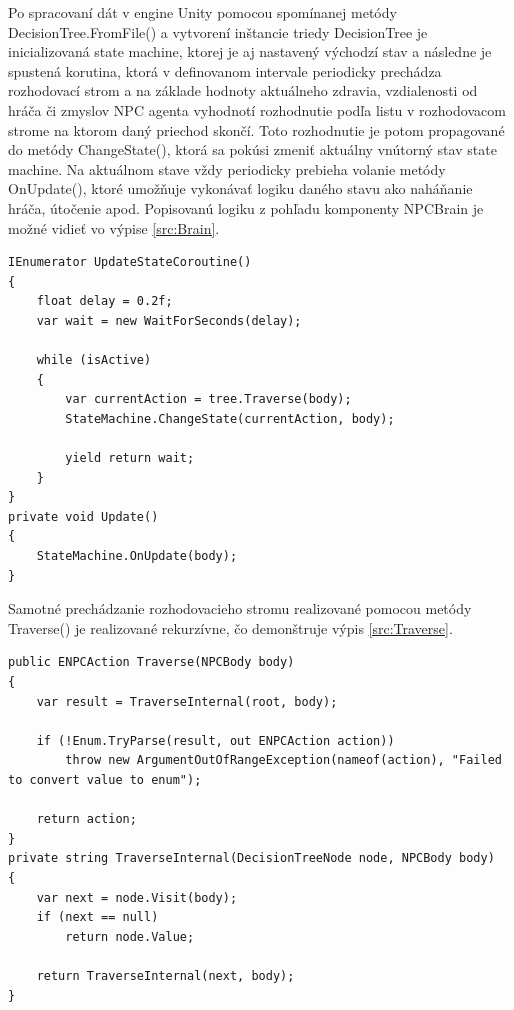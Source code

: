 \documentclass[slovak, master]{diploma}
\begin{document}
Po spracovaní dát v engine Unity pomocou spomínanej metódy DecisionTree.FromFile() a vytvorení inštancie triedy DecisionTree je inicializovaná state machine, ktorej je aj nastavený východzí stav a následne je spustená korutina, ktorá v definovanom intervale periodicky prechádza rozhodovací strom a na základe hodnoty aktuálneho zdravia, vzdialenosti od hráča či zmyslov NPC agenta vyhodnotí rozhodnutie podľa listu v rozhodovacom strome na ktorom daný priechod skončí. Toto rozhodnutie je potom propagované do metódy ChangeState(), ktorá sa pokúsi zmeniť aktuálny vnútorný stav state machine. Na aktuálnom stave vždy periodicky prebieha volanie metódy OnUpdate(), ktoré umožňuje vykonávať logiku daného stavu ako naháňanie hráča, útočenie apod. Popisovanú logiku z pohľadu komponenty NPCBrain je možné vidieť vo výpise \ref{src:Brain}.

\vspace{8pt}
\begin{lstlisting}[label=src:Brain,caption={Aktualizácia stavu NPC agenta}]
IEnumerator UpdateStateCoroutine()
{
    float delay = 0.2f;
    var wait = new WaitForSeconds(delay);

    while (isActive)
    {
        var currentAction = tree.Traverse(body);
        StateMachine.ChangeState(currentAction, body);

        yield return wait;
    }
}
private void Update()
{
    StateMachine.OnUpdate(body);
}
\end{lstlisting}

Samotné prechádzanie rozhodovacieho stromu realizované pomocou metódy Traverse() je realizované rekurzívne, čo demonštruje výpis \ref{src:Traverse}.

\vspace{8pt}
\begin{lstlisting}[label=src:Traverse,caption={Prechádzanie rozhodovacím stromom}]
public ENPCAction Traverse(NPCBody body)
{
    var result = TraverseInternal(root, body);
    
    if (!Enum.TryParse(result, out ENPCAction action))
        throw new ArgumentOutOfRangeException(nameof(action), "Failed to convert value to enum");

    return action;
}
private string TraverseInternal(DecisionTreeNode node, NPCBody body)
{
    var next = node.Visit(body);
    if (next == null)
        return node.Value;

    return TraverseInternal(next, body);
}
\end{lstlisting}
\end{document}
